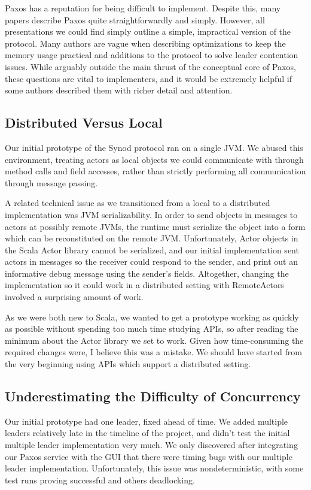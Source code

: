 \documentclass{sig-alternate}
\begin{document}
Paxos has a reputation for being difficult to implement. Despite this, many papers describe Paxos quite straightforwardly and simply. However, all presentations we could find simply outline a simple, impractical version of the protocol. Many authors are vague when describing optimizations to keep the memory usage practical and additions to the protocol to solve leader contention issues. While arguably outside the main thrust of the conceptual core of Paxos, these questions are vital to implementers, and it would be extremely helpful if some authors described them with richer detail and attention.

\subsection{Distributed Versus Local}
Our initial prototype of the Synod protocol ran on a single JVM. We abused this environment, treating actors as local objects we could communicate with through method calls and field accesses, rather than strictly performing all communication through message passing.

A related technical issue as we transitioned from a local to a distributed implementation was JVM serializability. In order to send objects in messages to actors at possibly remote JVMs, the runtime must serialize the object into a form which can be reconstituted on the remote JVM. Unfortunately, Actor objects in the Scala Actor library cannot be serialized, and our initial implementation sent actors in messages so the receiver could respond to the sender, and print out an informative debug message using the sender's fields. Altogether, changing the implementation so it could work in a distributed setting with RemoteActors involved a surprising amount of work. 

As we were both new to Scala, we wanted to get a prototype working as quickly as possible without spending too much time studying APIs, so after reading the minimum about the Actor library we set to work. Given how time-consuming the required changes were, I believe this was a mistake. We should have started from the very beginning using APIs which support a distributed setting.

\subsection{Underestimating the Difficulty of Concurrency}
Our initial prototype had one leader, fixed ahead of time. We added multiple leaders relatively late in the timeline of the project, and didn't test the initial multiple leader implementation very much. We only discovered after integrating our Paxos service with the GUI that there were timing bugs with our multiple leader implementation. Unfortunately, this issue was nondeterministic, with some test runs proving successful and others deadlocking. 
\end{document}
